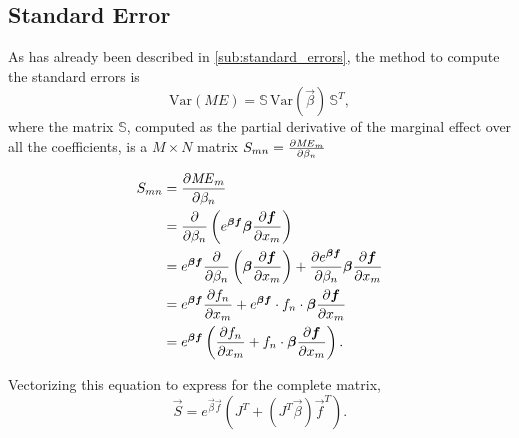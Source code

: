 \subsection{Standard Error}

As has already been described in \ref{sub:standard_errors}, the method to compute
the standard errors is
\begin{equation}
    \mbox{Var}(ME) = \mathbb{S}\, \mbox{Var}(\vec{\beta})\,
    \mathbb{S}^T,
\end{equation}
where the matrix $\mathbb{S}$, computed as the partial derivative of
the marginal effect over all the coefficients, is a $M\times N$ matrix $S_{mn}
= \pder[\mathit{ME}_m]{\beta_n}$

\begin{align*}
    S_{mn} & = \pder[\mathit{ME}_m]{\beta_n} \\
           & = \pder{\beta_n} \left( e^{\vec{\beta} \vec{f}} \vec{\beta} \pder[\vec{f}]{x_m}  \right)\\
           & = e^{\vec{\beta} \vec{f}} \pder{\beta_n}\left(\vec{\beta} \pder[\vec{f}]{x_m} \right) +
                \pder[e^{\vec{\beta} \vec{f}}]{\beta_n} \vec{\beta} \pder[\vec{f}]{x_m} \\
           & = e^{\vec{\beta} \vec{f}} \pder[f_n]{x_m} +
                e^{\vec{\beta} \vec{f}} \cdot f_n \cdot \vec{\beta} \pder[\vec{f}]{x_m} \\
           & = e^{\vec{\beta} \vec{f}} \left( \pder[f_n]{x_m} +
                  f_n \cdot \vec{\beta} \pder[\vec{f}]{x_m} \right).
\end{align*}

Vectorizing this equation to express for the complete matrix,
\begin{equation*}
  \vec{S} = e^{\vec{\beta} \vec{f}} \left(J^T +
                (J^T \vec{\beta}) \vec{f}^T \right).
\end{equation*}
